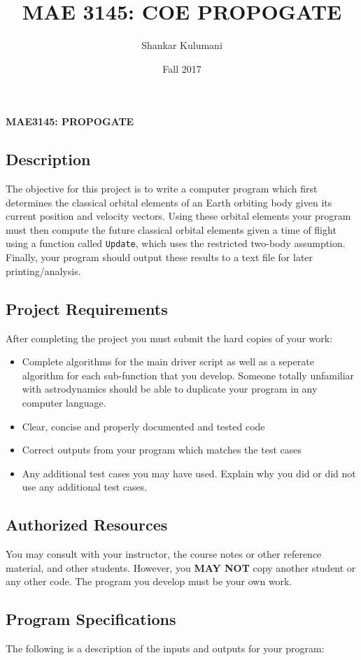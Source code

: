 \documentclass[11pt, reqno]{article}    %
\title{MAE 3145: COE PROPOGATE}
\author{Shankar Kulumani}
\date{Fall 2017}                          %
\begin{document}
\begin{center}
{\Large \textbf{MAE3145: PROPOGATE}}
\end{center}
\subsection*{Description}

The objective for this project is to write a computer program which first determines the classical orbital elements of an Earth orbiting body given its current position and velocity vectors. 
Using these orbital elements your program must then compute the future classical orbital elements given a time of flight using a function called \texttt{Update}, which uses the restricted two-body assumption.
Finally, your program should output these results to a text file for later printing/analysis. 

\subsection*{Project Requirements}
After completing the project you must submit the hard copies of your work:
\begin{itemize}
    \item Complete algorithms for the main driver script as well as a seperate algorithm for each sub-function that you develop.
        Someone totally unfamiliar with astrodynamics should be able to duplicate your program in any computer language.
    \item Clear, concise and properly documented and tested code
    \item Correct outputs from your program which matches the test cases
    \item Any additional test cases you may have used. 
        Explain why you did or did not use any additional test cases.
\end{itemize}

\subsection*{Authorized Resources}
You may consult with your instructor, the course notes or other reference material, and other students. 
However, you \textbf{MAY NOT} copy another student or any other code. 
The program you develop must be your own work.

\subsection*{Program Specifications}
The following is a description of the inputs and outputs for your program:
\end{document}
